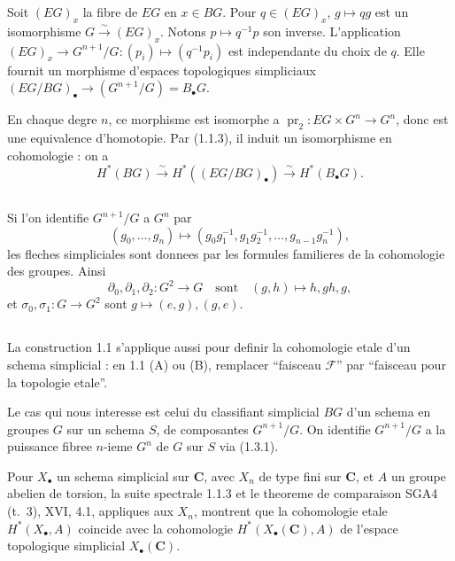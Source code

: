 \documentclass[11pt,a4paper]{article}
\theoremstyle{plain}
\theoremstyle{definition}
\DeclareMathOperator{\pr}{pr}
\begin{document}
Soit $(EG)_x$ la fibre de $EG$ en $x \in BG$. Pour $q \in (EG)_x$, $g \mapsto qg$ est un isomorphisme $G \xrightarrow{\sim} (EG)_x$. Notons $p \mapsto q^{-1}p$ son inverse. L'application $(EG)_x \to G^{n+1}/G : (p_i) \mapsto (q^{-1}p_i)$ est independante du choix de $q$. Elle fournit un morphisme d'espaces topologiques simpliciaux $(EG/BG)_\bullet \to (G^{n+1}/G) = B_\bullet G$.

En chaque degre $n$, ce morphisme est isomorphe a $\pr_2 : EG \times G^n \to G^n$, donc est une equivalence d'homotopie. Par (1.1.3), il induit un isomorphisme en cohomologie : on a
\begin{equation}\label{1.2.1}
H^*(BG) \xrightarrow{\sim} H^*((EG/BG)_\bullet) \xrightarrow{\sim} H^*(B_\bullet G).
\end{equation}

\subsection{}\label{1.3}

Si l'on identifie $G^{n+1}/G$ a $G^n$ par
\begin{equation}\label{1.3.1}
(g_0, \ldots, g_n) \longmapsto (g_0 g_1^{-1}, g_1 g_2^{-1}, \ldots, g_{n-1} g_n^{-1}),
\end{equation}
les fleches simpliciales sont donnees par les formules familieres de la cohomologie des groupes. Ainsi
\begin{equation}\label{1.3.2}
\partial_0, \partial_1, \partial_2 : G^2 \to G \quad \text{sont} \quad (g,h) \mapsto h, gh, g,
\end{equation}
et $\sigma_0, \sigma_1 : G \to G^2$ sont $g \mapsto (e,g), (g,e)$.

\subsection{}\label{1.4}

La construction 1.1 s'applique aussi pour definir la cohomologie etale d'un schema simplicial : en 1.1 (A) ou (B), remplacer ``faisceau $\mathscr{F}$'' par ``faisceau pour la topologie etale''.

Le cas qui nous interesse est celui du classifiant simplicial $BG$ d'un schema en groupes $G$ sur un schema $S$, de composantes $G^{n+1}/G$. On identifie $G^{n+1}/G$ a la puissance fibree $n$-ieme $G^n$ de $G$ sur $S$ via (1.3.1).

Pour $X_\bullet$ un schema simplicial sur $\mathbf{C}$, avec $X_n$ de type fini sur $\mathbf{C}$, et $A$ un groupe abelien de torsion, la suite spectrale 1.1.3 et le theoreme de comparaison SGA4 (t.~3), XVI, 4.1, appliques aux $X_n$, montrent que la cohomologie etale $H^*(X_\bullet, A)$ coincide avec la cohomologie $H^*(X_\bullet(\mathbf{C}), A)$ de l'espace topologique simplicial $X_\bullet(\mathbf{C})$.
\end{document}
